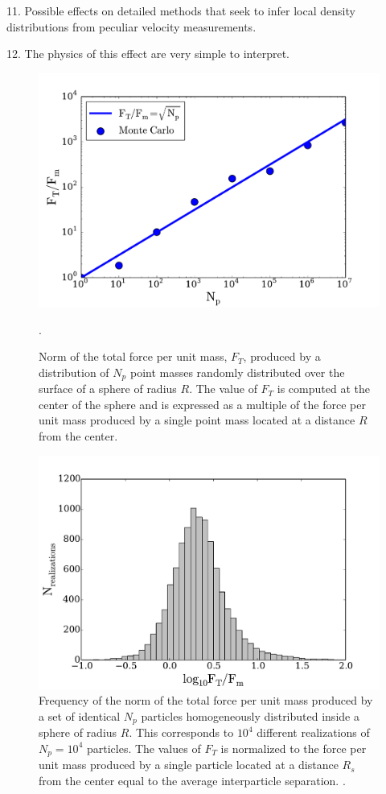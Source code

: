 \documentclass{article}
\begin{document}
11. Possible effects on detailed methods that seek to infer local
density distributions from peculiar velocity measurements. 

12. The physics of this effect are very simple to interpret.





\begin{figure}
\begin{center}
\includegraphics[width=0.8\linewidth,angle=0]{spheres_surface.pdf}
\caption{Norm of the total force per unit mass, $F_{T}$, produced by a
  distribution of $N_p$ point masses randomly distributed over the
  surface of a sphere of radius $R$. The value
  of $F_T$ is  computed at the center of the sphere and is  expressed
  as a multiple  of the force per unit mass produced by a  single
  point mass located  at a distance $R$ from the
  center. \label{fig:sphere_surface}}. 
\end{center}
\end{figure}


\begin{figure}
\begin{center}
\includegraphics[width=0.8\linewidth,angle=0]{spheres_bulk.pdf}
\caption{\label{fig:sphere_bulk} Frequency of the norm of the total
  force per unit mass produced by a set of identical $N_p$ particles
  homogeneously distributed inside a sphere of radius $R$. This
  corresponds to $10^4$ different realizations of $N_p=10^4$
  particles. The values of $F_T$ is normalized to the force per unit
  mass produced by a single particle located at a distance $R_s$ from
  the center equal to the average interparticle
  separation. \label{fig:sphere_surface}.}  
\end{center}
\end{figure}
\end{document}
